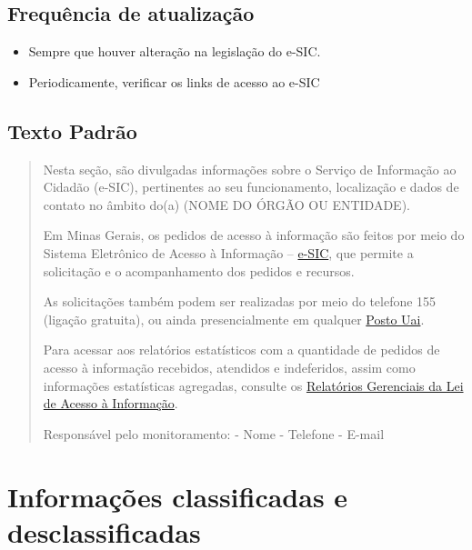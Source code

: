 \documentclass[]{book}
\providecommand{\tightlist}{%
  \setlength{\itemsep}{0pt}\setlength{\parskip}{0pt}}
\begin{document}
\hypertarget{frequuxeancia-de-atualizauxe7uxe3o}{%
\subsection{Frequência de atualização}\label{frequuxeancia-de-atualizauxe7uxe3o}}

\begin{itemize}
\tightlist
\item
  Sempre que houver alteração na legislação do e-SIC.
\item
  Periodicamente, verificar os links de acesso ao e-SIC
\end{itemize}

\hypertarget{texto-padruxe3o-1}{%
\subsection{Texto Padrão}\label{texto-padruxe3o-1}}

\begin{quote}
Nesta seção, são divulgadas informações sobre o Serviço de Informação ao Cidadão (e-SIC), pertinentes ao seu funcionamento, localização e dados de contato no âmbito do(a) (NOME DO ÓRGÃO OU ENTIDADE).

Em Minas Gerais, os pedidos de acesso à informação são feitos por meio do Sistema Eletrônico de Acesso à Informação -- \href{http://www.acessoainformacao.mg.gov.br}{e-SIC}, que permite a solicitação e o acompanhamento dos pedidos e recursos.

As solicitações também podem ser realizadas por meio do telefone 155 (ligação gratuita), ou ainda presencialmente em qualquer \href{http://www.planejamento.mg.gov.br/canais-de-atendimento-ao-cidadao/uais-unidades-de-atendimento-integrado/enderecos-das-uais}{Posto Uai}.

Para acessar aos relatórios estatísticos com a quantidade de pedidos de acesso à informação recebidos, atendidos e indeferidos, assim como informações estatísticas agregadas, consulte os \href{http://www.transparencia.mg.gov.br/o-que-e\#relatórios-gerenciais-–-lei-de-acesso-à-informação}{Relatórios Gerenciais da Lei de Acesso à Informação}.

Responsável pelo monitoramento:
- Nome
- Telefone
- E-mail
\end{quote}

\hypertarget{informauxe7uxf5es-classificadas-e-desclassificadas}{%
\section{Informações classificadas e desclassificadas}\label{informauxe7uxf5es-classificadas-e-desclassificadas}}
\end{document}
